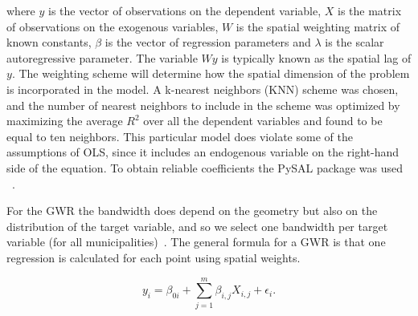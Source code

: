 \documentclass[12pt]{article}
\begin{document}
where $y$ is the vector of observations on the dependent variable, $X$ is the matrix of observations on the exogenous variables, $W$ is the spatial weighting matrix of known constants, $\beta$ is the vector of regression parameters and $\lambda$ is the scalar autoregressive parameter. The variable $Wy$ is typically known as the spatial lag of $y$. The weighting scheme will determine how the spatial dimension of the problem is incorporated in the model. A k-nearest neighbors (KNN) scheme was chosen, and the number of nearest neighbors to include in the scheme was optimized by maximizing the average $R^2$ over all the dependent variables and found to be equal to ten neighbors. This particular model does violate some of the assumptions of OLS, since it includes an endogenous variable on the right-hand side of the equation. To obtain reliable coefficients the PySAL package was used ~\cite{pysal2007}.

For the GWR the bandwidth does depend on the geometry but also on the distribution of the target variable, and so we select one bandwidth per target variable (for all municipalities)~\cite{oshan2019mgwr}.  The general formula for a GWR is that one regression is calculated for each point using spatial weights.

\begin{equation}
\label{eq:weights}
y_i=\beta_{0i}+ \sum _{j=1}^{m} \beta _{i,j}X_{i,j} + \epsilon_i.
\end{equation}
\end{document}
